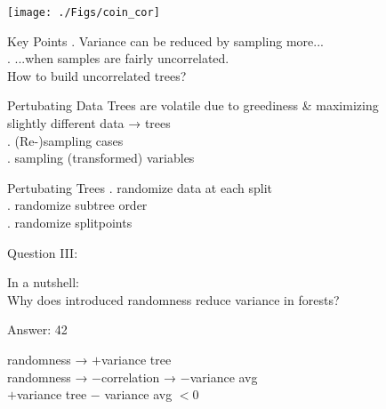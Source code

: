 \documentclass[12pt,t]{beamer}
\begin{document}
{\begin{frame}
  \begin{center}
  \texttt{[image: ./Figs/coin\_cor]}
  \end{center}
\end{frame}

\begin{frame}[c]{Key Points}
  . Variance can be reduced by sampling more...\\
  . ...when samples are fairly \textcolor{hilit}{uncorrelated}.\\
  \centering
   \Large How to build \textcolor{hilit}{uncorrelated} trees?
\end{frame}

\begin{frame}[c]{Pertubating Data}
    Trees are volatile due to \textcolor<1>{hilit}{greediness} \& \textcolor<1>{vhilit}{maximizing}\\
    slightly different data →   trees\\
    . \textcolor{lolit}{(Re-)}sampling \textcolor{hilit}{cases}\\
    . sampling \textcolor{lolit}{(transformed)} \textcolor{vhilit}{variables}\\
\end{frame}

\begin{frame}[c]{Pertubating Trees}
    . \textcolor{lolit}{randomize} data at each split\\
    . \textcolor{lolit}{randomize} subtree order\\
    . \textcolor{lolit}{randomize} splitpoints\\
\end{frame}

\begin{frame}[c]{Question III:}
\begin{center}
  \Large \textcolor{lolit}{In a nutshell:}\\ Why does introduced randomness reduce variance in forests?
\end{center}
\end{frame}

\begin{frame}[c]{Answer: 42}
\begin{center}
  randomness → \textcolor{vhilit}{$+$}variance tree\\
  randomness → \textcolor{hilit}{$-$}correlation → \textcolor{hilit}{$-$}variance avg\\
  \textcolor{vhilit}{$+$}variance tree \textcolor{hilit}{$-$} variance avg \textcolor{hilit}{$<0$}\\
\end{center}
\end{frame}

}
\end{document}
